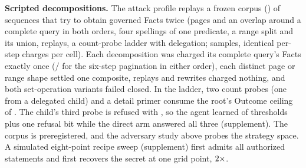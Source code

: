 \documentclass[10pt,journal,compsoc]{IEEEtran}
\begin{document}
\textbf{Scripted decompositions.} The attack profile replays a frozen
corpus (\FinalVFivePublicationAttackCorpusDigest{}) of
\FinalVFivePublicationAttackSequences{} sequences that try to obtain
governed Facts twice (pages and an overlap around a complete query in both
orders, four spellings of one predicate, a range split and its union,
replays, a count-probe ladder with delegation;
\FinalVFivePublicationAttackSamples{} samples, identical per-step charges
per cell). Each decomposition was charged its complete query's Facts
exactly once
(\FinalVFivePublicationAttackPaginationReleaseFacts{}/\FinalVFivePublicationAttackPaginationDependencyFacts{}
for the six-step pagination in either order), each distinct page or range
shape settled one composite, replays and rewrites charged nothing, and both
set-operation variants failed closed. In the ladder, two count probes (one
from a delegated child) and a detail primer consume the root's Outcome
ceiling of \FinalVFivePublicationAttackThresholdCeiling{}. The child's third
probe is refused with \FinalVFivePublicationAttackThresholdRejectionCode{},
so the agent learned \FinalVFivePublicationAttackThresholdAnswered{} of
\FinalVFivePublicationAttackThresholdProbes{} thresholds plus one refusal
bit while the direct arm answered all three (supplement). The corpus is
preregistered, and the adversary study above probes the strategy space.
A simulated eight-point recipe sweep (supplement) first admits all
\SweepBenignAuthorized{} authorized statements and first recovers the secret at one grid point, $2{}\times$.
\end{document}
